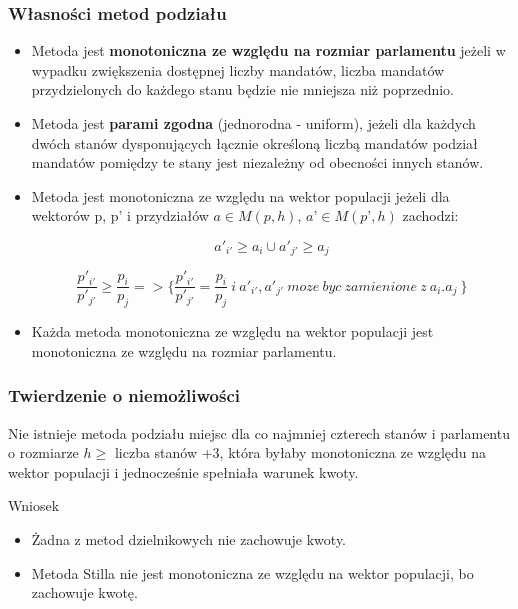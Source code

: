 \documentclass[12pt,a4paper]{article}
\begin{document}
\subsubsection{Własności metod podziału}
\begin{itemize}
\item Metoda jest \textbf{monotoniczna ze względu na rozmiar parlamentu} jeżeli w wypadku zwiększenia dostępnej liczby mandatów, liczba mandatów przydzielonych do każdego stanu będzie nie mniejsza niż poprzednio.
\item Metoda jest \textbf{parami zgodna} (jednorodna - uniform), jeżeli dla każdych dwóch stanów dysponujących łącznie określoną liczbą mandatów podział mandatów pomiędzy te stany jest niezależny od obecności innych stanów.

\item Metoda jest monotoniczna ze względu na wektor populacji jeżeli dla wektorów p, p’ i przydziałów $a\in M(p,h)$, $a’\in M(p’,h)$ zachodzi:

\begin{equation}
a'_{i'}\geq a_i \cup a'_{j'}\geq a_j
\end{equation}

\begin{equation}
\frac{p'_{i'}}{p'_{j'}}\geq \frac{p_i}{p_j} =>\lbrace \frac{p'_{i'}}{p'_{j'}}=\frac{p_i}{p_j} \ i \ a'_{i'},a'_{j'} \  moze \ byc \  zamienione \ z \ a_i.a_j \ \rbrace
\end{equation}

\item Każda metoda monotoniczna ze względu na wektor populacji jest monotoniczna ze względu na rozmiar parlamentu.

\end{itemize}

\subsubsection{Twierdzenie o niemożliwości}

Nie istnieje metoda podziału miejsc dla co najmniej czterech stanów i parlamentu o rozmiarze
$h \geq $ liczba stanów +3, która byłaby monotoniczna ze względu na wektor populacji i jednocześnie spełniała warunek kwoty.

Wniosek

\begin{itemize}
\item Żadna z metod dzielnikowych nie zachowuje kwoty.
\item Metoda Stilla nie jest monotoniczna ze względu na wektor populacji, bo zachowuje kwotę.
\end{itemize}
\end{document}
